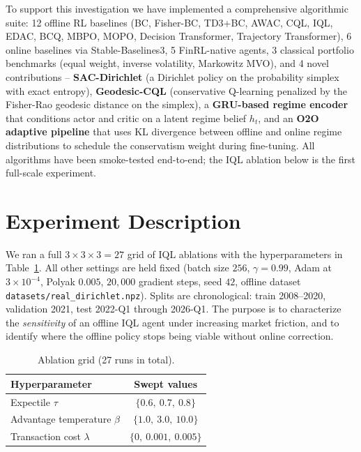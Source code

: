 To support this investigation we have implemented a comprehensive
algorithmic suite: 12 offline RL baselines (BC, Fisher-BC, TD3+BC, AWAC,
CQL, IQL, EDAC, BCQ, MBPO, MOPO, Decision Transformer, Trajectory
Transformer), 6 online baselines via Stable-Baselines3, 5 FinRL-native
agents, 3 classical portfolio benchmarks (equal weight, inverse
volatility, Markowitz MVO), and 4 novel contributions --
\textbf{SAC-Dirichlet} (a Dirichlet policy on the probability simplex
with exact entropy), \textbf{Geodesic-CQL} (conservative Q-learning
penalized by the Fisher-Rao geodesic distance on the simplex),
a \textbf{GRU-based regime encoder} that conditions actor and critic on
a latent regime belief $h_t$, and an \textbf{O2O adaptive pipeline} that
uses KL divergence between offline and online regime distributions to
schedule the conservatism weight during fine-tuning.  All algorithms
have been smoke-tested end-to-end; the IQL ablation below is the first
full-scale experiment.

\section{Experiment Description}

We ran a full $3 \times 3 \times 3 = 27$ grid of IQL ablations
with the hyperparameters in Table~\ref{tab:hparams}.  All other settings
are held fixed (batch size $256$, $\gamma = 0.99$, Adam at
$3{\times}10^{-4}$, Polyak $0.005$, $20{,}000$ gradient steps, seed
$42$, offline dataset \texttt{datasets/real\_dirichlet.npz}).  Splits
are chronological: train 2008--2020, validation 2021, test 2022-Q1
through 2026-Q1.  The purpose is to characterize the \emph{sensitivity}
of an offline IQL agent under increasing market friction, and to
identify where the offline policy stops being viable without online
correction.
\vspace{-10pt}
\begin{table}[h]
\centering
\begin{tabular}{lc}
\toprule
Hyperparameter & Swept values \\
\midrule
Expectile $\tau$                  & $\{0.6,\ 0.7,\ 0.8\}$ \\
Advantage temperature $\beta$     & $\{1.0,\ 3.0,\ 10.0\}$ \\
Transaction cost $\lambda$        & $\{0,\ 0.001,\ 0.005\}$ \\
\bottomrule
\end{tabular}
\vspace{-10pt}
\caption{Ablation grid (27 runs in total).}
\label{tab:hparams}
\end{table}
\vspace{-13pt}

